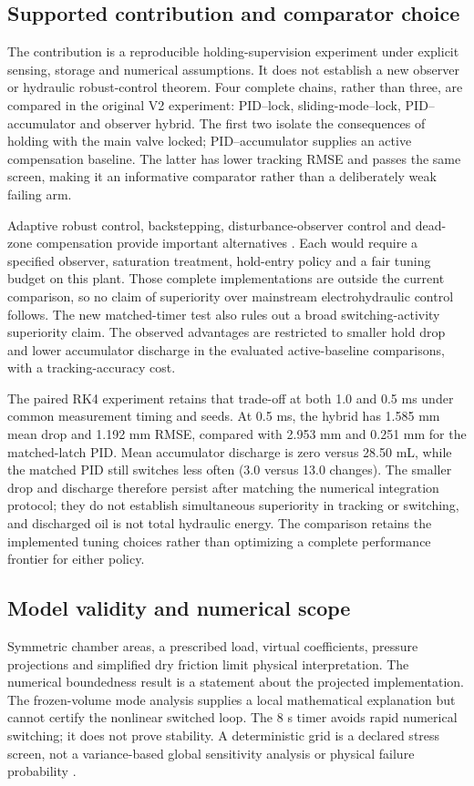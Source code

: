\documentclass[machines,article,submit,pdftex,moreauthors]{Definitions/mdpi}
\begin{document}
\subsection{Supported contribution and comparator choice}
The contribution is a reproducible holding-supervision experiment under explicit sensing, storage and numerical assumptions. It does not establish a new observer or hydraulic robust-control theorem. Four complete chains, rather than three, are compared in the original V2 experiment: PID--lock, sliding-mode--lock, PID--accumulator and observer hybrid. The first two isolate the consequences of holding with the main valve locked; PID--accumulator supplies an active compensation baseline. The latter has lower tracking RMSE and passes the same screen, making it an informative comparator rather than a deliberately weak failing arm.

Adaptive robust control, backstepping, disturbance-observer control and dead-zone compensation provide important alternatives \cite{yao2000,guan2008,choux2010,deng2017,chen2016}. Each would require a specified observer, saturation treatment, hold-entry policy and a fair tuning budget on this plant. Those complete implementations are outside the current comparison, so no claim of superiority over mainstream electrohydraulic control follows. The new matched-timer test also rules out a broad switching-activity superiority claim. The observed advantages are restricted to smaller hold drop and lower accumulator discharge in the evaluated active-baseline comparisons, with a tracking-accuracy cost.

The paired RK4 experiment retains that trade-off at both 1.0 and 0.5 ms under common measurement timing and seeds. At 0.5 ms, the hybrid has 1.585 mm mean drop and 1.192 mm RMSE, compared with 2.953 mm and 0.251 mm for the matched-latch PID. Mean accumulator discharge is zero versus 28.50 mL, while the matched PID still switches less often (3.0 versus 13.0 changes). The smaller drop and discharge therefore persist after matching the numerical integration protocol; they do not establish simultaneous superiority in tracking or switching, and discharged oil is not total hydraulic energy. The comparison retains the implemented tuning choices rather than optimizing a complete performance frontier for either policy.

\subsection{Model validity and numerical scope}
Symmetric chamber areas, a prescribed load, virtual coefficients, pressure projections and simplified dry friction limit physical interpretation. The numerical boundedness result is a statement about the projected implementation. The frozen-volume mode analysis supplies a local mathematical explanation but cannot certify the nonlinear switched loop. The 8 s timer avoids rapid numerical switching; it does not prove stability. A deterministic grid is a declared stress screen, not a variance-based global sensitivity analysis or physical failure probability \cite{saltelli2010}.
\end{document}
